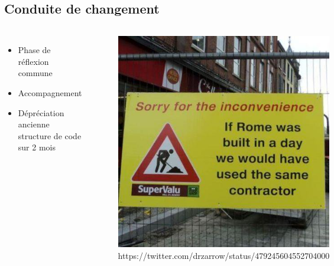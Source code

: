 \subsection{Conduite de changement}
\begin{frame}{\subsecname}
	\begin{columns}[onlytextwidth]
		\begin{itemize}
			\item Phase de réflexion commune
			\item Accompagnement
			\item Dépréciation ancienne structure de code sur 2 mois
		\end{itemize}
		\begin{figure}
			\includegraphics[width=0.6\linewidth]{img/rome.jpg}
			\captionsetup{labelformat=empty}
			\caption{https://twitter.com/drzarrow/status/479245604552704000}
			\label{fig:rome}
		\end{figure}
	\end{columns}
\end{frame}

